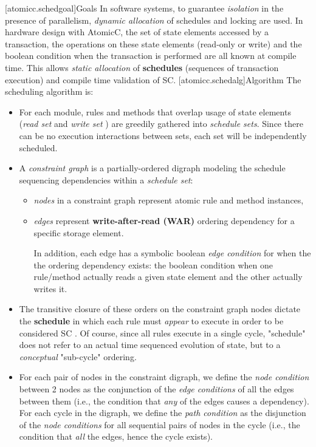 [atomicc.schedgoal]{Goals}
In software systems, to guarantee \textit{isolation} in the presence of
parallelism, \textit{dynamic allocation}\cite[p.~377]{GrayR93} of schedules
and locking\cite[Sec.~11.2]{OV11} are used.
In hardware design with AtomicC,
the set of state elements accessed by a transaction,
the operations on these state elements (read-only or write)
and the boolean condition when the transaction is performed
are all known at compile time.
This allows \textit{static allocation}\cite[Sec.~7.3.1]{GrayR93} of \textbf{schedules}
(sequences of transaction execution)
and compile time validation of SC.
\newline
{}[atomicc.schedalg]{Algorithm}
The scheduling algorithm is:
\begin{itemize}
\item For each module, rules and methods that overlap usage of state elements
(\textit{read set} and \textit{write set}\cite[Sec.~10.1.2]{OV11} \cite{RosenkrantzSternsLewis})
are greedily gathered into \textit{schedule sets}.
Since there can be no execution interactions between sets,
each set will be independently scheduled.
\item A \textit{constraint graph} is a partially-ordered digraph modeling
the schedule sequencing dependencies within a \textit{schedule set}:
\begin{itemize}
\item \textit{nodes} in a constraint graph represent atomic rule and method instances,
\item \textit{edges} represent \textbf{write-after-read (WAR)} ordering dependency
for a specific storage element\cite[Sec.~3]{Cain2003}.

In addition, each edge has a symbolic boolean \textit{edge condition} for when the
the ordering dependency exists: the boolean
condition when one rule/method actually reads a given state element
and the other actually writes it.
\end{itemize}

\item The transitive closure of these orders on the constraint graph nodes
dictate the \textbf{schedule} in which each rule must \textit{appear} to execute in
order to be considered SC
\cite[Sec.~11.1]{OV11}.
Of course, since all rules execute in a single cycle, "schedule" does not
refer to an actual time sequenced evolution of state,
but to a \textit{conceptual} "sub-cycle" ordering.

\item For each pair of nodes in the constraint digraph, we define the \textit{node condition}
between 2 nodes as the conjunction of the \textit{edge conditions} of all the edges between
them (i.e., the condition that \textit{any} of the edges causes a dependency).
For each cycle in the digraph, we define the \textit{path condition}
as the disjunction of the \textit{node conditions} for all sequential pairs of nodes
in the cycle (i.e., the condition that \textit{all} the edges, hence the cycle exists).


\end{itemize}
